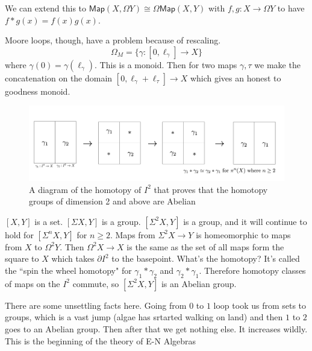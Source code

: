 \documentclass[12pt]{article}
\theoremstyle{definition}
\begin{document}
	
	We can extend this to $\mathsf{Map}(X,\Omega Y)\cong \Omega\mathsf{Map}(X,Y)$ with $f,g:X\to \Omega Y$ to have $f\ast g(x)=f(x)g(x)$. 
	
	Moore loops, though, have a problem because of rescaling.\[
	\Omega_M=\{\gamma:[0,\ell_\gamma]\to X\}
	\]
	where $\gamma(0)=\gamma(\ell_\gamma)$. This is a monoid. Then for two maps $\gamma, \tau$ we make the concatenation on the domain $[0,\ell_\gamma+\ell_\tau]\to X$ which gives an honest to goodness monoid. 
	\begin{figure}
		\includegraphics[width=\textwidth]{homotopygroupsabelian.png}
		\caption{A diagram of the homotopy of $I^2$ that proves that the homotopy groups of dimension 2 and above are Abelian}
	\end{figure}
	
	$[X,Y]$ is a set. $[\Sigma X, Y]$ is a group. $[\Sigma^2 X, Y]$ is a group, and it will continue to hold for $[\Sigma^n X, Y]$ for $n\geq 2$. Maps from $\Sigma^2 X\to Y$ is homeomorphic to maps from $X$ to $\Omega^2 Y$. Then $\Omega^2 X \to X$ is the same as the set of all maps form the square to $X$ which takes $\partial I^2$ to the basepoint. What's the homotopy? It's called the ``spin the wheel homotopy" for $\gamma_1\ast \gamma_2$ and $\gamma_2\ast \gamma_1$. Therefore homotopy classes of maps on the $I^2$ commute, so $[\Sigma^2 X, Y]$ is an Abelian group. 
	
	There are some unsettling facts here. Going from $0$ to $1$ loop took us from sets to groups, which is a vast jump (algae has srtarted walking on land) and then $1$ to $2$ goes to an Abelian group. Then after that we get nothing else. It increases wildly. This is the beginning of the theory of E-N Algebras
	
\end{document}

